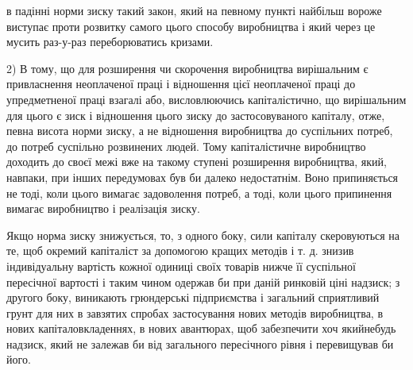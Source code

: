 \parcont{}  %
в падінні норми зиску такий закон, який на певному пункті
найбільш вороже виступає проти розвитку самого цього способу
виробництва і який через це мусить раз-у-раз переборюватись
кризами.

2) В тому, що для розширення чи скорочення виробництва
вирішальним є привласнення неоплаченої праці і відношення цієї
неоплаченої праці до упредметненої праці взагалі або, висловлюючись
капіталістично, що вирішальним для цього є зиск
і відношення цього зиску до застосовуваного капіталу, отже,
певна висота норми зиску, а не відношення виробництва до
суспільних потреб, до потреб суспільно розвинених людей. Тому
капіталістичне виробництво доходить до своєї межі вже на
такому ступені розширення виробництва, який, навпаки, при
інших передумовах був би далеко недостатнім. Воно припиняється
не тоді, коли цього вимагає задоволення потреб, а тоді,
коли цього припинення вимагає виробництво і реалізація зиску.

Якщо норма зиску знижується, то, з одного боку, сили
капіталу скеровуються на те, щоб окремий капіталіст за допомогою
кращих методів і т. д. знизив індивідуальну вартість
кожної одиниці своїх товарів нижче її суспільної пересічної
вартості і таким чином одержав би при даній ринковій ціні
надзиск; з другого боку, виникають грюндерські підприємства
і загальний сприятливий грунт для них в завзятих спробах застосування
нових методів виробництва, в нових капіталовкладеннях,
в нових авантюрах, щоб забезпечити хоч якийнебудь
надзиск, який не залежав би від загального пересічного рівня
і перевищував би його.

